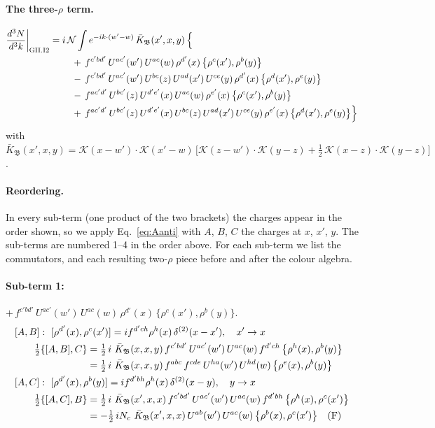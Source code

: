 \documentclass[10pt]{article}
\numberwithin{equation}{section}
\newcommand{\KK}{\mathcal K}
\newcommand{\NN}{\mathcal N}
\begin{document}
\paragraph{The three-$\rho$ term.}
\begin{align}
\frac{d^3N}{d^3k}\bigg|_{\rm GII.I2}={}&i\,\NN\int e^{-ik\cdot(w'-w)}\,\bar K_{\mathfrak B}(x',x,y)\,\Big\{\notag\\
&\quad +\,f^{c'bd'}\,U^{ac'}(w')\,U^{ac}(w)\,\rho^{d'}(x)\,\big\{\rho^{c}(x'),\rho^{b}(y)\big\}\notag\\
&\quad -\,f^{c'bd'}\,U^{ac'}(w')\,U^{bc}(z)\,U^{ad}(x')\,U^{ce}(y)\,\rho^{d'}(x)\,\big\{\rho^{d}(x'),\rho^{e}(y)\big\}\notag\\
&\quad -\,f^{ac'd'}\,U^{bc'}(z)\,U^{d'e'}(x)\,U^{ac}(w)\,\rho^{e'}(x)\,\big\{\rho^{c}(x'),\rho^{b}(y)\big\}\notag\\
&\quad +\,f^{ac'd'}\,U^{bc'}(z)\,U^{d'e'}(x)\,U^{bc}(z)\,U^{ad}(x')\,U^{ce}(y)\,\rho^{e'}(x)\,\big\{\rho^{d}(x'),\rho^{e}(y)\big\}\Big\}\label{eq:in-GII.I2}
\end{align}
with $\bar K_{\mathfrak B}(x',x,y)=\KK(x-w')\cdot\KK(x'-w)\,\Big[\KK(z-w')\cdot\KK(y-z)+\tfrac12\,\KK(x-z)\cdot\KK(y-z)\Big]$.
\paragraph{Reordering.} In every sub-term (one product of the two brackets) the charges appear in the order shown, so we apply Eq.~\eqref{eq:Aanti} with $A$, $B$, $C$ the charges at $x$, $x'$, $y$. The sub-terms are numbered 1--4 in the order above. For each sub-term we list the commutators, and each resulting two-$\rho$ piece before and after the colour algebra.
\paragraph{Sub-term 1:} $+\,f^{c'bd'}\,U^{ac'}(w')\,U^{ac}(w)\,\rho^{d'}(x)\,\big\{\rho^{c}(x'),\rho^{b}(y)\big\}$.
\begin{align}
&[A,B]:\ [\rho^{d'}(x),\rho^{c}(x')]=i f^{d'ch}\rho^{h}(x)\,\delta^{(2)}(x-x'),\quad x'\to x\notag\\
&\qquad \tfrac12\{[A,B],C\}=\tfrac12\,i\,\,\bar K_{\mathfrak B}(x,x,y)\,f^{c'bd'}\,U^{ac'}(w')\,U^{ac}(w)\,f^{d'ch}\,\big\{\rho^{h}(x),\rho^{b}(y)\big\}\notag\\
&\qquad\phantom{\tfrac12\{[A,B],C\}}=\tfrac12\,i\,\,\bar K_{\mathfrak B}(x,x,y)\,f^{abc}\,f^{cde}\,U^{ha}(w')\,U^{hd}(w)\,\big\{\rho^{e}(x),\rho^{b}(y)\big\}
\label{eq:GII.I2-1-AB}\\
&[A,C]:\ [\rho^{d'}(x),\rho^{b}(y)]=i f^{d'bh}\rho^{h}(x)\,\delta^{(2)}(x-y),\quad y\to x\notag\\
&\qquad \tfrac12\{[A,C],B\}=\tfrac12\,i\,\,\bar K_{\mathfrak B}(x',x,x)\,f^{c'bd'}\,U^{ac'}(w')\,U^{ac}(w)\,f^{d'bh}\,\big\{\rho^{h}(x),\rho^{c}(x')\big\}\notag\\
&\qquad\phantom{\tfrac12\{[A,C],B\}}=-\tfrac12\,i N_{c}\,\,\bar K_{\mathfrak B}(x',x,x)\,U^{ab}(w')\,U^{ac}(w)\,\big\{\rho^{b}(x),\rho^{c}(x')\big\}\quad\text{(F)}
\label{eq:GII.I2-1-AC}
\end{align}
\end{document}
